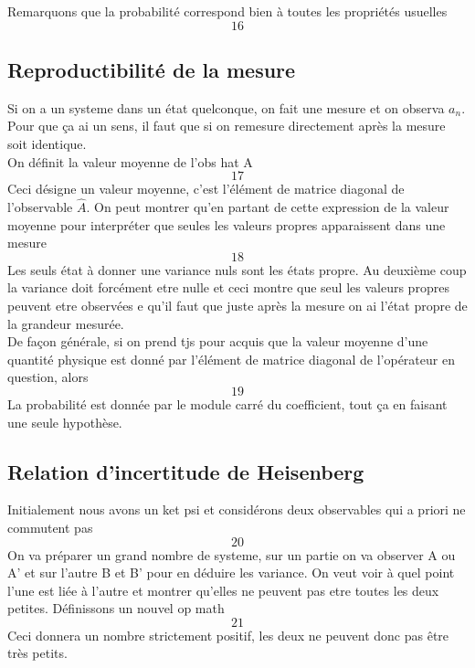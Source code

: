  Remarquons que la probabilité correspond bien à toutes les propriétés 
 usuelles
 \begin{equation}
 16
 \end{equation}
 
 \subsection{Reproductibilité de la mesure}
 Si on a un systeme dans un état quelconque, on fait une mesure et 
 on observa $a_n$. Pour que ça ai un sens, il faut que si on remesure 
 directement après la mesure soit identique. \\
 
 On définit la valeur moyenne de l'obs hat A
 \begin{equation}
 17
 \end{equation}
 Ceci désigne un valeur moyenne, c'est l'élément de matrice diagonal de 
 l'observable $\hat{A}$. On peut montrer qu'en partant de cette 
 expression de la valeur moyenne pour interpréter que seules les valeurs 
 propres apparaissent dans une mesure
 \begin{equation}
 18
 \end{equation}
 Les seuls état à donner une variance nuls sont les états propre. Au 
 deuxième coup la variance doit forcément etre nulle et ceci montre que 
 seul les valeurs propres peuvent etre observées e qu'il faut que juste 
 après la mesure on ai l'état propre de la grandeur mesurée. \\
 
 De façon générale, si on prend tjs pour acquis que la valeur moyenne 
 d'une quantité physique est donné par l'élément de matrice diagonal 
 de l'opérateur en question, alors
 \begin{equation}
 19
 \end{equation}
 La probabilité est donnée par le module carré du coefficient, tout ça 
 en faisant une seule hypothèse.\\
 
 \subsection{Relation d'incertitude de Heisenberg}
 Initialement nous avons un ket psi et considérons deux observables qui 
 a priori ne commutent pas
 \begin{equation}
 20
 \end{equation}
 On va préparer un grand nombre de systeme, sur un partie on va observer
 A ou A' et sur l'autre B et B' pour en déduire les variance. On veut 
 voir à quel point l'une est liée à l'autre et montrer qu'elles ne peuvent 
 pas etre toutes les deux petites. Définissons un nouvel op math 
 \begin{equation}
 21
 \end{equation}
 Ceci donnera un nombre strictement positif, les deux ne peuvent donc 
 pas être très petits. 